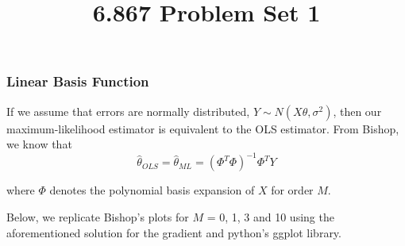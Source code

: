 \documentclass[10pt]{article}
\begin{document}
	\title{6.867 Problem Set 1}
	\maketitle

\subsubsection*{Linear Basis Function}

If we assume that errors are normally distributed,  $Y \sim N(X\theta, \sigma^2)$, then our maximum-likelihood estimator is equivalent to the OLS estimator. From Bishop, we know that
\begin{equation*}
	\hat{\theta}_{OLS}=\hat{\theta}_{ML}=(\Phi^T \Phi)^{-1}\Phi^T Y
\end{equation*}

where $\Phi$ denotes the polynomial basis expansion of $X$ for order $M$.

Below, we replicate Bishop's plots for $M$ = 0, 1, 3 and 10 using the aforementioned solution for the gradient and python's ggplot library.
\end{document}
